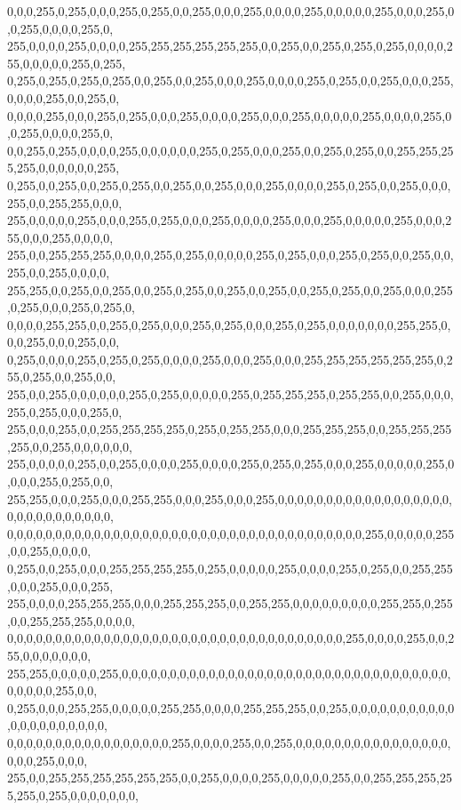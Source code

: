 \begin{DoxyCode}
      0,0,0,255,0,255,0,0,0,255,0,255,0,0,255,0,0,0,255,0,0,0,0,255,0,0,0,0,0,255,0,0,0,255,0,0,255,0,0,0,0,255,0,
      255,0,0,0,0,255,0,0,0,0,255,255,255,255,255,255,0,0,255,0,0,255,0,255,0,255,0,0,0,0,255,0,0,0,0,0,255,0,255,
      0,255,0,255,0,255,0,255,0,0,255,0,0,255,0,0,0,255,0,0,0,0,255,0,255,0,0,255,0,0,0,255,0,0,0,0,255,0,0,255,0,
      0,0,0,0,255,0,0,0,255,0,255,0,0,0,255,0,0,0,0,255,0,0,0,255,0,0,0,0,0,255,0,0,0,0,255,0,0,255,0,0,0,0,255,0,
      0,0,255,0,255,0,0,0,0,255,0,0,0,0,0,0,255,0,255,0,0,0,255,0,0,255,0,255,0,0,255,255,255,255,0,0,0,0,0,0,255,
      0,255,0,0,255,0,0,255,0,255,0,0,255,0,0,255,0,0,0,255,0,0,0,0,255,0,255,0,0,255,0,0,0,255,0,0,255,255,0,0,0,
      255,0,0,0,0,0,255,0,0,0,255,0,255,0,0,0,255,0,0,0,0,255,0,0,0,255,0,0,0,0,0,255,0,0,0,255,0,0,0,255,0,0,0,0,
      255,0,0,255,255,255,0,0,0,0,255,0,255,0,0,0,0,0,255,0,255,0,0,0,255,0,255,0,0,255,0,0,255,0,0,255,0,0,0,0,
      255,255,0,0,255,0,0,255,0,0,255,0,255,0,0,255,0,0,255,0,0,255,0,255,0,0,255,0,0,0,255,0,255,0,0,0,255,0,255,0,
      0,0,0,0,255,255,0,0,255,0,255,0,0,0,255,0,255,0,0,0,255,0,255,0,0,0,0,0,0,0,255,255,0,0,0,255,0,0,0,255,0,0,
      0,255,0,0,0,0,255,0,255,0,255,0,0,0,0,255,0,0,0,255,0,0,0,255,255,255,255,255,255,0,255,0,255,0,0,255,0,0,
      255,0,0,255,0,0,0,0,0,0,255,0,255,0,0,0,0,0,255,0,255,255,255,0,255,255,0,0,255,0,0,0,255,0,255,0,0,0,255,0,
      255,0,0,0,255,0,0,255,255,255,255,0,255,0,255,255,0,0,0,255,255,255,0,0,255,255,255,255,0,0,255,0,0,0,0,0,0,
      255,0,0,0,0,0,255,0,0,255,0,0,0,0,255,0,0,0,0,255,0,255,0,255,0,0,0,255,0,0,0,0,0,255,0,0,0,0,255,0,255,0,0,
      255,255,0,0,0,255,0,0,0,255,255,0,0,0,255,0,0,0,255,0,0,0,0,0,0,0,0,0,0,0,0,0,0,0,0,0,0,0,0,0,0,0,0,0,0,0,0,0,
      0,0,0,0,0,0,0,0,0,0,0,0,0,0,0,0,0,0,0,0,0,0,0,0,0,0,0,0,0,0,0,0,0,0,0,0,0,255,0,0,0,0,0,255,0,0,255,0,0,0,0,
      0,255,0,0,255,0,0,0,255,255,255,255,0,255,0,0,0,0,0,255,0,0,0,0,255,0,255,0,0,255,255,0,0,0,255,0,0,0,255,
      255,0,0,0,0,255,255,255,0,0,0,255,255,255,0,0,255,255,0,0,0,0,0,0,0,0,0,255,255,0,255,0,0,255,255,255,0,0,0,0,
      0,0,0,0,0,0,0,0,0,0,0,0,0,0,0,0,0,0,0,0,0,0,0,0,0,0,0,0,0,0,0,0,0,0,0,255,0,0,0,0,255,0,0,255,0,0,0,0,0,0,0,
      255,255,0,0,0,0,0,255,0,0,0,0,0,0,0,0,0,0,0,0,0,0,0,0,0,0,0,0,0,0,0,0,0,0,0,0,0,0,0,0,0,0,0,0,0,0,0,255,0,0,
      0,255,0,0,0,255,255,0,0,0,0,0,255,255,0,0,0,0,255,255,255,0,0,255,0,0,0,0,0,0,0,0,0,0,0,0,0,0,0,0,0,0,0,0,0,
      0,0,0,0,0,0,0,0,0,0,0,0,0,0,0,0,0,255,0,0,0,0,255,0,0,255,0,0,0,0,0,0,0,0,0,0,0,0,0,0,0,0,0,0,0,255,0,0,0,
      255,0,0,255,255,255,255,255,255,0,0,255,0,0,0,0,255,0,0,0,0,0,255,0,0,255,255,255,255,255,0,255,0,0,0,0,0,0,0,

\end{DoxyCode}
